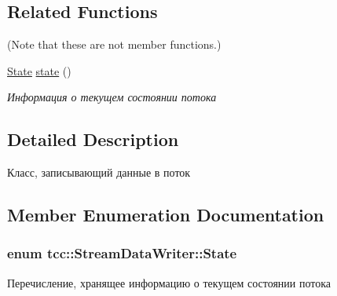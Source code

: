 \subsection*{Related Functions}
(Note that these are not member functions.) \begin{DoxyCompactItemize}
\item 
\hyperlink{classtcc_1_1_stream_data_writer_a014e8165660b60c024aee93941f283e1}{State} \hyperlink{classtcc_1_1_stream_data_writer_a2ea7c803af9a02fa1c400b540be037ff}{state} ()\hypertarget{classtcc_1_1_stream_data_writer_a2ea7c803af9a02fa1c400b540be037ff}{}\label{classtcc_1_1_stream_data_writer_a2ea7c803af9a02fa1c400b540be037ff}

\begin{DoxyCompactList}\small\item\em Информация о текущем состоянии потока \end{DoxyCompactList}\end{DoxyCompactItemize}


\subsection{Detailed Description}
Класс, записывающий данные в поток 

\subsection{Member Enumeration Documentation}
\subsubsection[{\texorpdfstring{State}{State}}]{\setlength{\rightskip}{0pt plus 5cm}enum {\bf tcc\+::\+Stream\+Data\+Writer\+::\+State}}\hypertarget{classtcc_1_1_stream_data_writer_a014e8165660b60c024aee93941f283e1}{}\label{classtcc_1_1_stream_data_writer_a014e8165660b60c024aee93941f283e1}


Перечисление, хранящее информацию о текущем состоянии потока 

